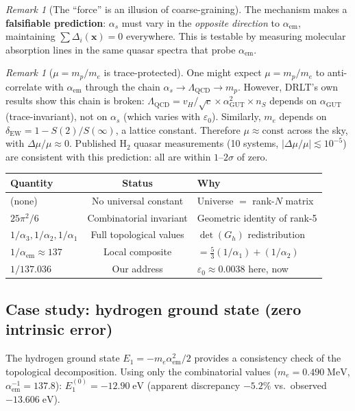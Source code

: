 \documentclass[12pt]{article}
\theoremstyle{remark}
\newtheorem{remark}[theorem]{Remark}
\theoremstyle{definition}
\begin{document}
\begin{remark}[The ``force'' is an illusion of coarse-graining]
The mechanism makes a \textbf{falsifiable prediction}: $\alpha_s$ must vary in the \emph{opposite direction} to $\alpha_\text{em}$, maintaining $\sum\Delta_i(\mathbf{x}) = 0$ everywhere. This is testable by measuring molecular absorption lines in the same quasar spectra that probe $\alpha_\text{em}$.

\begin{remark}[$\mu = m_p/m_e$ is trace-protected]
One might expect $\mu = m_p/m_e$ to anti-correlate with $\alpha_\text{em}$ through the chain $\alpha_s \to \Lambda_\text{QCD} \to m_p$. However, DRLT's own results show this chain is broken: $\Lambda_\text{QCD} = v_H/\sqrt{c} \times \alpha_\text{GUT}^2 \times n_S$ depends on $\alpha_\text{GUT}$ (trace-invariant), not on $\alpha_s$ (which varies with $\varepsilon_0$). Similarly, $m_e$ depends on $\delta_\text{EW} = 1 - S(2)/S(\infty)$, a lattice constant. Therefore $\mu \approx \text{const}$ across the sky, with $\Delta\mu/\mu \approx 0$. Published H$_2$ quasar measurements (10 systems, $|\Delta\mu/\mu| \lesssim 10^{-5}$) are consistent with this prediction: all are within $1$--$2\sigma$ of zero.
\end{remark}

\begin{center}
\begin{tabular}{lcl}
\hline
Quantity & Status & Why \\
\hline
(none) & No universal constant & Universe $=$ rank-$N$ matrix \\
$25\pi^2/6$ & Combinatorial invariant & Geometric identity of rank-5 \\
$1/\alpha_3, 1/\alpha_2, 1/\alpha_1$ & Full topological values & $\det(G_h)$ redistribution \\
$1/\alpha_\text{em} \approx 137$ & Local composite & $= \tfrac{5}{3}(1/\alpha_1) + (1/\alpha_2)$ \\
$1/137.036$ & Our address & $\varepsilon_0 \approx 0.0038$ here, now \\
\hline
\end{tabular}
\end{center}

\subsection{Case study: hydrogen ground state (zero intrinsic error)}

The hydrogen ground state $E_1 = -m_e\alpha_\text{em}^2/2$ provides a consistency check of the topological decomposition. Using only the combinatorial values ($m_e = 0.490\;\text{MeV}$, $\alpha_\text{em}^{-1} = 137.8$): $E_1^{(0)} = -12.90\;\text{eV}$ (apparent discrepancy $-5.2\%$ vs.\ observed $-13.606\;\text{eV}$).


\end{remark}
\end{document}

